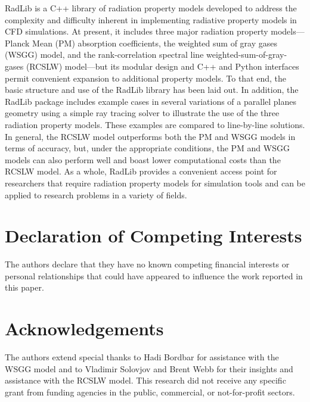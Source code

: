 \documentclass[preprint,12pt]{elsarticle}
\begin{document}
RadLib is a C++ library of radiation property models developed to address the complexity and difficulty inherent in implementing radiative property models in CFD simulations. At present, it includes three major radiation property models---Planck Mean (PM) absorption coefficients, the weighted sum of gray gases (WSGG) model, and the rank-correlation spectral line weighted-sum-of-gray-gases (RCSLW) model---but its modular design and C++ and Python interfaces permit convenient expansion to additional property models. To that end, the basic structure and use of the RadLib library has been laid out. In addition, the RadLib package includes example cases in several variations of a parallel planes geometry using a simple ray tracing solver to illustrate the use of the three radiation property models. These examples are compared to line-by-line solutions. In general, the RCSLW model outperforms both the PM and WSGG models in terms of accuracy, but, under the appropriate conditions, the PM and WSGG models can also perform well and boast lower computational costs than the RCSLW model. As a whole, RadLib provides a convenient access point for researchers that require radiation property models for simulation tools and can be applied to research problems in a variety of fields. 


\section{Declaration of Competing Interests} \label{s:coi}

The authors declare that they have no known competing financial interests or personal relationships that could have appeared to influence the work reported in this paper.



\section*{Acknowledgements} \label{sec:acknowledgements}

The authors extend special thanks to Hadi Bordbar for assistance with the WSGG model and to Vladimir Solovjov and Brent Webb for their insights and assistance with the RCSLW model. 
This research did not receive any specific grant from funding agencies in the public, commercial, or
not-for-profit sectors.
\end{document}
